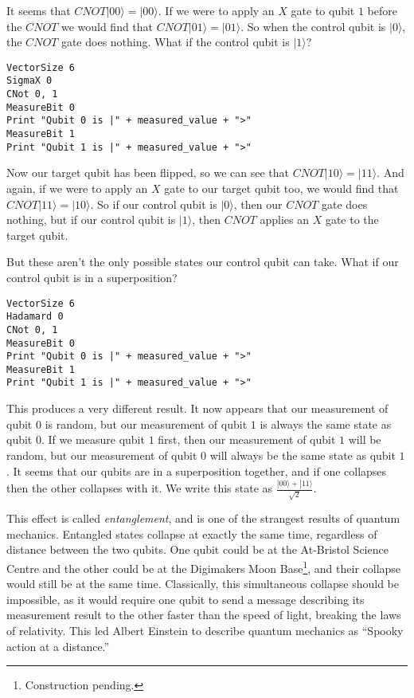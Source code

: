 \documentclass[twocolumn]{article}
\begin{document}
It seems that $CNOT|00\rangle = |00\rangle$. If we were to apply an $X$ gate to qubit $1$ before the $CNOT$ we would find that $CNOT|01\rangle = |01\rangle$. So when the control qubit is $|0\rangle$, the $CNOT$ gate does nothing. What if the control qubit is $|1\rangle$?

\begin{lstlisting}
VectorSize 6
SigmaX 0
CNot 0, 1
MeasureBit 0
Print "Qubit 0 is |" + measured_value + ">"
MeasureBit 1
Print "Qubit 1 is |" + measured_value + ">"
\end{lstlisting}

Now our target qubit has been flipped, so we can see that $CNOT|10\rangle = |11\rangle$. And again, if we were to apply an $X$ gate to our target qubit too, we would find that $CNOT|11\rangle = |10\rangle$. So if our control qubit is $|0\rangle$, then our $CNOT$ gate does nothing, but if our control qubit is $|1\rangle$, then $CNOT$ applies an $X$ gate to the target qubit.

But these aren't the only possible states our control qubit can take. What if our control qubit is in a superposition?

\begin{lstlisting}
VectorSize 6
Hadamard 0
CNot 0, 1
MeasureBit 0
Print "Qubit 0 is |" + measured_value + ">"
MeasureBit 1
Print "Qubit 1 is |" + measured_value + ">"
\end{lstlisting}

This produces a very different result. It now appears that our measurement of qubit $0$ is random, but our measurement of qubit $1$ is always the same state as qubit $0$. If we measure qubit $1$ first, then our measurement of qubit $1$ will be random, but our measurement of qubit $0$ will always be the same state as qubit $1$. It seems that our qubits are in a superposition together, and if one collapses then the other collapses with it. We write this state as $\frac{|00\rangle + |11\rangle}{\sqrt{2}}$.

This effect is called {\em entanglement}, and is one of the strangest results of quantum mechanics. Entangled states collapse at exactly the same time, regardless of distance between the two qubits. One qubit could be at the At-Bristol Science Centre and the other could be at the Digimakers Moon Base\footnote{Construction pending.}, and their collapse would still be at the same time. Classically, this simultaneous collapse should be impossible, as it would require one qubit to send a message describing its measurement result to the other faster than the speed of light, breaking the laws of relativity. This led Albert Einstein to describe quantum mechanics as ``Spooky action at a distance.''
\end{document}
